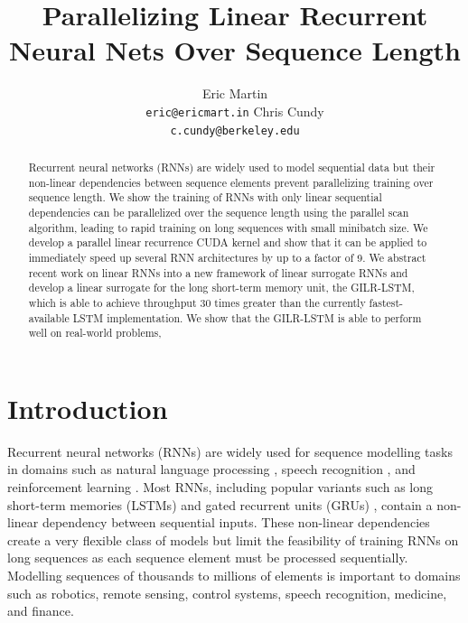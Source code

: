 \documentclass{article}
\title{Parallelizing Linear Recurrent Neural Nets Over Sequence Length}
\author{
  Eric Martin \\%
  \texttt{eric@ericmart.in}
  \And
  Chris Cundy \\
  \texttt{c.cundy@berkeley.edu}
}
\begin{document}

\maketitle

\begin{abstract}
Recurrent neural networks (RNNs) are widely used to model sequential data but
their non-linear dependencies between sequence elements prevent parallelizing
training over sequence length. We show the training of RNNs with only linear
sequential dependencies can be parallelized over the sequence length using the
parallel scan algorithm, leading to rapid training on long sequences with small
minibatch size. We develop a
parallel linear recurrence CUDA kernel and show that it can be applied to
immediately speed up several RNN architectures by up to a factor of 9. We abstract
recent work on linear RNNs into a new framework of linear surrogate RNNs and develop
a linear surrogate for the long short-term memory unit, the GILR-LSTM, which is
able to achieve throughput 30 times greater than the currently fastest-available LSTM
implementation. We show that the GILR-LSTM is able to perform well on real-world
problems,
\end{abstract}

\section{Introduction}
Recurrent neural networks (RNNs) are widely used for sequence modelling tasks in
domains such as natural language processing \cite{sutskever2014sequence}, speech
recognition \cite{amodei2015deep}, and reinforcement learning
\cite{hausknecht2015deep}. Most RNNs, including popular variants such as long
short-term memories (LSTMs) \cite{hochreiter1997long} and gated recurrent units
(GRUs) \cite{cho2014learning}, contain a non-linear dependency between
sequential inputs. These non-linear dependencies create a very flexible class of
models but limit the feasibility of training RNNs on long sequences as each
sequence element must be processed sequentially.  Modelling sequences of
thousands to millions of elements is important to domains such as robotics,
remote sensing, control systems, speech recognition, medicine, and finance.
\end{document}

